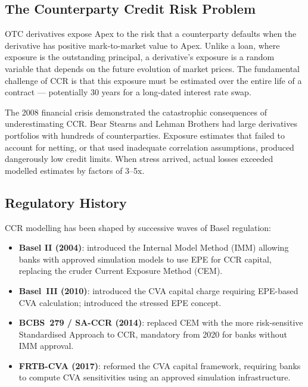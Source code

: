 \documentclass[11pt,a4paper]{article}
\begin{document}
\subsection{The Counterparty Credit Risk Problem}

OTC derivatives expose Apex to the risk that a counterparty defaults when the
derivative has positive mark-to-market value to Apex. Unlike a loan, where
exposure is the outstanding principal, a derivative's exposure is a random
variable that depends on the future evolution of market prices. The fundamental
challenge of CCR is that this exposure must be estimated over the entire life
of a contract --- potentially 30 years for a long-dated interest rate swap.

The 2008 financial crisis demonstrated the catastrophic consequences of
underestimating CCR. Bear Stearns and Lehman Brothers had large derivatives
portfolios with hundreds of counterparties. Exposure estimates that failed to
account for netting, or that used inadequate correlation assumptions, produced
dangerously low credit limits. When stress arrived, actual losses exceeded
modelled estimates by factors of 3--5x.

\subsection{Regulatory History}

CCR modelling has been shaped by successive waves of Basel regulation:

\begin{itemize}[noitemsep]
  \item \textbf{Basel II (2004)}: introduced the Internal Model Method (IMM)
        allowing banks with approved simulation models to use EPE for CCR
        capital, replacing the cruder Current Exposure Method (CEM).
  \item \textbf{Basel~III (2010)}: introduced the CVA capital charge requiring
        EPE-based CVA calculation; introduced the stressed EPE concept.
  \item \textbf{BCBS~279 / SA-CCR (2014)}: replaced CEM with the more
        risk-sensitive Standardised Approach to CCR, mandatory from 2020 for
        banks without IMM approval.
  \item \textbf{FRTB-CVA (2017)}: reformed the CVA capital framework,
        requiring banks to compute CVA sensitivities using an approved
        simulation infrastructure.
\end{itemize}
\end{document}
